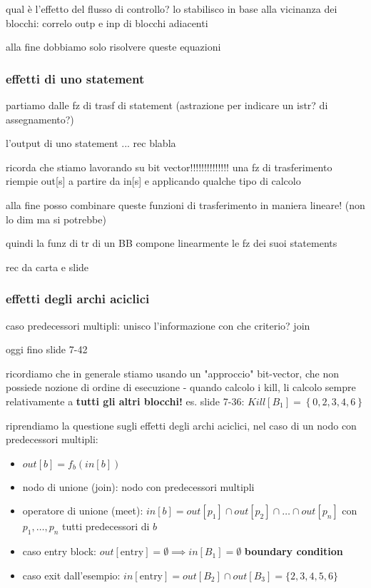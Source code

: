 qual \`e l'effetto del flusso di controllo? lo stabilisco in base alla vicinanza dei blocchi: correlo outp e inp di blocchi adiacenti

alla fine dobbiamo solo risolvere queste equazioni 

\subsubsection{effetti di uno statement}

partiamo dalle fz di trasf di statement (astrazione per indicare un istr? di assegnamento?)

l'output di uno statement ... rec blabla

ricorda che stiamo lavorando su bit vector!!!!!!!!!!!!!! una fz di trasferimento riempie out[s] a partire da in[s] e applicando qualche tipo di calcolo

alla fine posso combinare queste funzioni di trasferimento in maniera lineare! (non lo dim ma si potrebbe)

quindi la funz di tr di un BB compone linearmente le fz dei suoi statements

rec da carta e slide

\subsubsection{effetti degli archi aciclici}

caso predecessori multipli: unisco l'informazione con che criterio? join

oggi fino slide 7-42

ricordiamo che in generale stiamo usando un "approccio" bit-vector, che non possiede nozione di ordine di esecuzione - quando calcolo i kill, li calcolo sempre relativamente a \textbf{tutti gli altri blocchi!} es. slide 7-36: $Kill[B_1] = \left\lbrace0,2,3,4,6\right\rbrace$

riprendiamo la questione sugli effetti degli archi aciclici, nel caso di un nodo con predecessori multipli:
\begin{itemize}
  \item $out[b] = f_b(in[b])$
  \item nodo di unione (join): nodo con predecessori multipli
  \item operatore di unione (meet): $in[b] = out[p_1] \cap out[p_2] \cap \ldots \cap out[p_n]$ con $p_1,\ldots,p_n$ tutti predecessori di $b$
  \item caso entry block: $out[\text{entry}] = \emptyset \implies in[B_1] = \emptyset$ \textbf{boundary condition}
  \item caso exit dall'esempio: $in[\text{entry}] = out[B_2] \cap out[B_3] = \lbrace 2,3,4,5,6 \rbrace$
\end{itemize}


